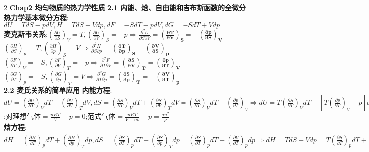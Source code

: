 \documentclass[10pt,a4paper]{article}
\begin{document}
\begin{multicols}{2}
\noindent\textbf{Chap2 均匀物质的热力学性质}
\textbf{2.1 内能、焓、自由能和吉布斯函数的全微分}\\
\textbf{热力学基本微分方程}:$dU=TdS-pdV,H=TdS+Vdp,dF=-SdT-pdV,dG=-SdT+Vdp$\\
\textbf{麦克斯韦关系}:$\left(\frac{\partial U}{\partial S}\right)_V=T,\left(\frac{\partial U}{\partial V}\right)_S=-p\Rightarrow\frac{\partial^2U}{\partial S\partial V}=\bm{\left(\frac{\partial T}{\partial V}\right)_S=-\left(\frac{\partial p}{\partial S}\right)_V}$\\
\indent$\left(\frac{\partial H}{\partial S}\right)_p=T,\left(\frac{\partial H}{\partial p}\right)_S=V\Rightarrow\frac{\partial^2H}{\partial S\partial p}=\bm{\left(\frac{\partial T}{\partial p}\right)_S=\left(\frac{\partial V}{\partial S}\right)_p}$\\
\indent$\left(\frac{\partial F}{\partial T}\right)_V=-S,\left(\frac{\partial F}{\partial V}\right)_T=-p\Rightarrow\frac{\partial^2F}{\partial T\partial V}=\bm{\left(\frac{\partial S}{\partial V}\right)_T=\left(\frac{\partial p}{\partial T}\right)_V}$\\
\indent$\left(\frac{\partial G}{\partial T}\right)_p=-S,\left(\frac{\partial G}{\partial p}\right)_T=V\Rightarrow\frac{\partial^2G}{\partial T\partial p}=\bm{\left(\frac{\partial S}{\partial p}\right)_T=-\left(\frac{\partial V}{\partial T}\right)_p}$\\
\textbf{2.2 麦氏关系的简单应用}
\textbf{内能方程}:$dU=\left(\frac{\partial U}{\partial T}\right)_VdT+\left(\frac{\partial U}{\partial V}\right)_TdV,dS=\left(\frac{\partial S}{\partial T}\right)_VdT+\left(\frac{\partial S}{\partial V}\right)_TdV=\left(\frac{\partial S}{\partial T}\right)_VdT+\left(\frac{\partial p}{\partial T}\right)_V\Rightarrow dU=T\left(\frac{\partial S}{\partial T}\right)_VdT+\left[T\left(\frac{\partial p}{\partial T}\right)_V-p\right]dV\Rightarrow\bm{C_V=\left(\frac{\partial U}{\partial T}\right)_V=T\left(\frac{\partial S}{\partial T}\right)_V,\left(\frac{\partial U}{\partial V}\right)_T=T\left(\frac{\partial p}{\partial T}\right)_V-p}$;对理想气体$=\frac{nRT}{V}-p=0$;范式气体$=\frac{nRT}{V-nb}-p=\frac{an^2}{V^2}$\\
\textbf{焓方程}:$dH=\left(\frac{\partial H}{\partial T}\right)_pdT+\left(\frac{\partial H}{\partial p}\right)_Tdp,dS=\left(\frac{\partial S}{\partial T}\right)_pdT+\left(\frac{\partial S}{\partial p}\right)_Tdp=\left(\frac{\partial S}{\partial T}\right)_pdT-\left(\frac{\partial V}{\partial T}\right)_pdp\Rightarrow dH=TdS+Vdp=T\left(\frac{\partial S}{\partial T}\right)_pdT+\left[V-T\left(\frac{\partial V}{\partial T}\right)_p\right]dp\Rightarrow\bm{C_p=\left(\frac{\partial H}{\partial T}\right)_p=T\left(\frac{\partial S}{\partial T}\right)_p,\left(\frac{\partial H}{\partial p}\right)_T=V-T\left(\frac{\partial V}{\partial T}\right)_p}$\\

\end{multicols}
\end{document}
